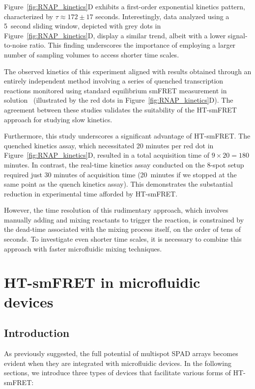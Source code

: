 Figure~\ref{fig:RNAP_kinetics}D exhibits a first-order exponential kinetics pattern, characterized by $\tau \approx 172 \pm 17$ seconds.
Interestingly, data analyzed using a 5~second sliding window, depicted with grey dots in Figure~\ref{fig:RNAP_kinetics}D, display a similar trend, albeit with a lower signal-to-noise ratio. 
This finding underscores the importance of employing a larger number of sampling volumes to access shorter time scales. 

The observed kinetics of this experiment aligned with results obtained through an entirely independent method involving a series of quenched transcription reactions monitored using standard equilibrium \ac{smFRET} measurement in solution~\cite{lerner_PNAS_2016} (illustrated by the red dots in Figure~\ref{fig:RNAP_kinetics}D). 
The agreement between these studies validates the suitability of the \ac{HT-smFRET} approach for studying slow kinetics.

Furthermore, this study underscores a significant advantage of \ac{HT-smFRET}. 
The quenched kinetics assay, which necessitated 20 minutes per red dot in Figure~\ref{fig:RNAP_kinetics}D, resulted in a total acquisition time of $9 \times 20 = 180$ minutes. 
In contrast, the real-time kinetics assay conducted on the 8-spot setup required just 30 minutes of acquisition time (20~minutes if we stopped at the same point as the quench kinetics assay). 
This demonstrates the substantial reduction in experimental time afforded by \ac{HT-smFRET}.

However, the time resolution of this rudimentary approach, which involves manually adding and mixing reactants to trigger the reaction, is constrained by the dead-time associated with the mixing process itself, on the order of tens of seconds. 
To investigate even shorter time scales, it is necessary to combine this approach with faster microfluidic mixing techniques.

\section{HT-smFRET in microfluidic devices}
\label{sec:microfluidics}

\subsection{Introduction}
\label{sec:microfluidics_intro}

As previously suggested, the full potential of multispot \ac{SPAD} arrays becomes evident when they are integrated with microfluidic devices. 
In the following sections, we introduce three types of devices that facilitate various forms of \ac{HT-smFRET}:

